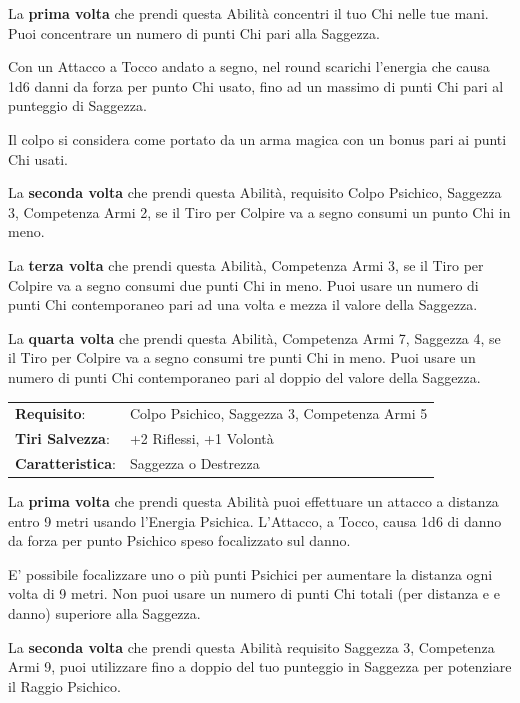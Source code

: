 \begin{multicols}{2}
La \textbf{prima volta} che prendi questa Abilità concentri il tuo Chi nelle tue mani. Puoi concentrare un numero di punti Chi pari alla Saggezza.

Con un Attacco a Tocco andato a segno, nel round scarichi l'energia che causa 1d6 danni da forza per punto Chi usato, fino ad un massimo di punti Chi pari al punteggio di Saggezza.

Il colpo si considera come portato da un arma magica con un bonus pari ai punti Chi usati.

La \textbf{seconda volta} che prendi questa Abilità, requisito Colpo Psichico, Saggezza 3, Competenza Armi 2, se il Tiro per Colpire va a segno consumi un punto Chi in meno.

La \textbf{terza volta} che prendi questa Abilità, Competenza Armi 3, se il Tiro per Colpire va a segno consumi due punti Chi in meno. Puoi usare un numero di punti Chi contemporaneo pari ad una volta e mezza il valore della Saggezza.

La \textbf{quarta volta} che prendi questa Abilità, Competenza Armi 7, Saggezza 4, se il Tiro per Colpire va a segno consumi tre punti Chi in meno. Puoi usare un numero di punti Chi contemporaneo pari al doppio del valore della Saggezza.

\noindent\begin{tabularx}{\linewidth}{>{\raggedright\arraybackslash}p{2.5cm}X}
\rowcolor{gray!20}\textbf{Requisito}: & Colpo Psichico, Saggezza 3, Competenza Armi 5\\
\textbf{Tiri Salvezza}: & +2 Riflessi, +1 Volontà\\
\rowcolor{gray!20}\textbf{Caratteristica}: & Saggezza o Destrezza\\
\end{tabularx}\smallskip

La \textbf{prima volta} che prendi questa Abilità puoi effettuare un attacco a distanza entro 9 metri usando l'Energia Psichica. L'Attacco, a Tocco, causa 1d6 di danno da forza per punto Psichico speso focalizzato sul danno.

E' possibile focalizzare uno o più punti Psichici per aumentare la distanza ogni volta di 9 metri. Non puoi usare un numero di punti Chi totali (per distanza e e danno) superiore alla Saggezza.

La \textbf{seconda volta} che prendi questa Abilità requisito Saggezza 3, Competenza Armi 9, puoi utilizzare fino a doppio del tuo punteggio in Saggezza per potenziare il Raggio Psichico.


\end{multicols}
